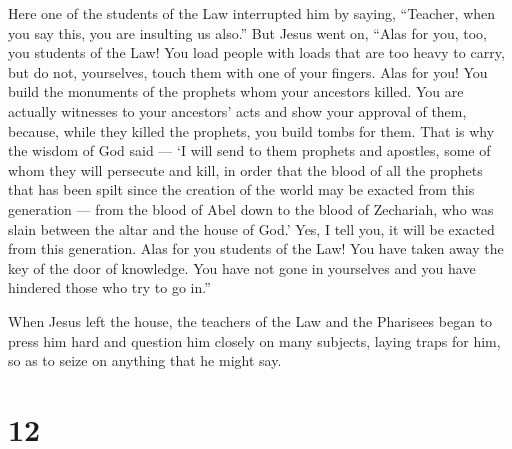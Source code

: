 Here one of the students of the Law interrupted him by
saying, ``Teacher, when you say this, you are insulting us also.''
 But Jesus went on, ``Alas for you, too, you students of
the Law! You load people with loads that are too heavy to carry, but do
not, yourselves, touch them with one of your fingers.  Alas
for you! You build the monuments of the prophets whom your ancestors
killed.  You are actually witnesses to your ancestors' acts
and show your approval of them, because, while they killed the prophets,
you build tombs for them.  That is why the wisdom of God
said --- `I will send to them prophets and apostles,  some
of whom they will persecute and kill, in order that the blood of all the
prophets that has been spilt since the creation of the world may be
exacted from this generation ---  from the blood of Abel
down to the blood of Zechariah, who was slain between the altar and the
house of God.' Yes, I tell you, it will be exacted from this generation.
 Alas for you students of the Law! You have taken away the
key of the door of knowledge. You have not gone in yourselves and you
have hindered those who try to go in.''

 When Jesus left the house, the teachers of the Law and the
Pharisees began to press him hard and question him closely on many
subjects,  laying traps for him, so as to seize on anything
that he might say.

\hypertarget{section-10}{%
\section{12}\label{section-10}}

